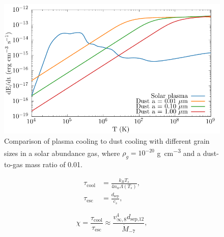 \parencite{schureNewRadiativeCooling2009}
\parencite{rybickiRadiativeProcessesAstrophysics2004}




\begin{figure}
  \centering
  \includegraphics{assets/dust-plasma-cooling-comparison/cooling-comparison.pdf}
  \caption[Dust cooling vs. plasma cooling]{Comparison of plasma cooling to dust cooling with different grain sizes in a solar abundance gas, where $\rho_g = 10^{-20}$ \si{\gram\per\centi\metre\cubed} and a dust-to-gas mass ratio of 0.01.}
  \label{fig:dustplasmacomparison}
\end{figure}



\begin{subequations}
  \begin{align}
    \tau_\text{cool} & = \frac{k_B T_s}{4n_w \Lambda(T_s)} \label{eq:taucool} ,\\ 
    \tau_\text{esc}  & = \frac{d_\text{sep}}{c_s} \label{eq:tauesc} ,
  \end{align}
\end{subequations}

\begin{equation}
  \chi = \frac{\tau_\text{cool}}{\tau_\text{esc}} \approx \frac{v^4_{\infty,8} d_\text{sep,12}}{\dot M_{-7}} \label{eq:coolingparameter} ,
\end{equation}




